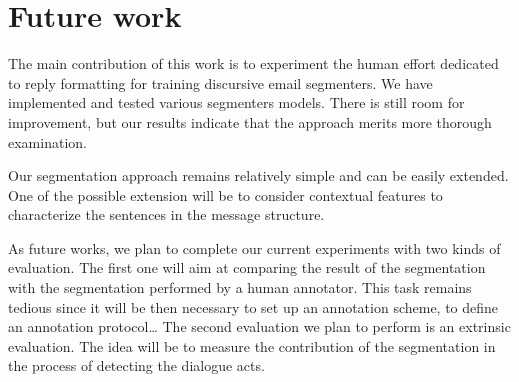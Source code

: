 

\section{Future work}
\label{sec:futureWork}

The main contribution of this work is to experiment the human effort dedicated to reply formatting for training discursive email segmenters. 
We have implemented and tested various segmenters models. 
There is still room for improvement, but our results indicate that the approach merits more thorough examination.

Our segmentation approach remains relatively simple and can be easily extended. One of the possible extension will be to consider contextual features to characterize the sentences in the message structure.

As future works, we plan to complete our current experiments with two kinds of evaluation. The first one will aim at comparing the result of the segmentation with the segmentation performed by a human annotator. 
This task remains tedious since it will be then necessary to set up an annotation scheme, to define an annotation protocol\ldots
The second evaluation we plan to perform is an extrinsic evaluation. The idea will be to measure the contribution of the segmentation in the process of detecting the dialogue acts.

